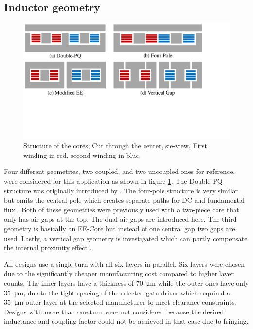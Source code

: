 \documentclass{IPEC2026}
\begin{document}
\subsection{Inductor geometry}
\begin{figure}
  \includegraphics[page=1, trim = 0cm 7cm 4.5cm 0cm, clip, width=\columnwidth]{figures/IPEC_Figures_PowerPoint.pdf}
  \caption{Structure of the cores; Cut through the center, sie-view. First winding in red, second winding in blue.}
  \label{fig:Core_Drawings}
\end{figure}
Four different geometries, two coupled, and two uncoupled ones for reference, were considered for this application as shown in figure \ref{fig:Core_Drawings}. The Double-PQ structure was originally introduced by \cite{wangPCBWindingBasedCoupled2023}. The four-pole structure is very similar but omits the central pole which creates separate paths for DC and fundamental flux \cite{huaUltrathinCoupledInductor2021}. Both of these geometries were previously used with a two-piece core that only has air-gaps at the top. The dual air-gaps are introduced here. The third geometry is basically an EE-Core but instead of one central gap two gaps are used. Lastly, a vertical gap geometry is investigated which can partly compensate the internal proximity effect \cite{schaferNovelHighlyEfficient2020}. %
\par All designs use a single turn with all six layers in parallel. Six layers were chosen due to the significantly cheaper manufacturing cost compared to higher layer counts. The inner layers have a thickness of \qty{70}{\um} while the outer ones have only \qty{35}{\um}, due to the tight spacing of the selected gate-driver which required a \qty{35}{\um} outer layer at the selected manufacturer to meet clearance constraints. Designs with more than one turn were not considered because the desired inductance and coupling-factor could not be achieved in that case due to fringing.
\end{document}

